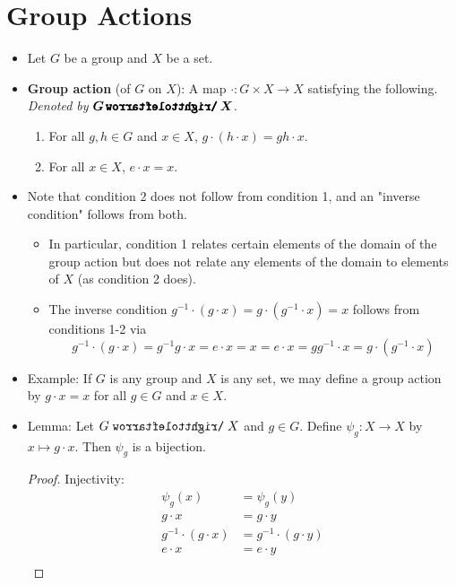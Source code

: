 \documentclass[../notes.tex]{subfiles}
\begin{document}
\section{Group Actions}
\begin{itemize}
    \item {}Let $G$ be a group and $X$ be a set.
    \item \textbf{Group action} (of $G$ on $X$): A map $\cdot:G\times X\to X$ satisfying the following. \emph{Denoted by} $\bm{G\,\pmb{\acts}\,X}$.
    \begin{enumerate}
        \item For all $g,h\in G$ and $x\in X$, $g\cdot(h\cdot x)=gh\cdot x$.
        \item For all $x\in X$, $e\cdot x=x$.
    \end{enumerate}
    \item Note that condition 2 does not follow from condition 1, and an "inverse condition" follows from both.
    \begin{itemize}
        \item In particular, condition 1 relates certain elements of the domain of the group action but does not relate any elements of the domain to elements of $X$ (as condition 2 does).
        \item The inverse condition $g^{-1}\cdot(g\cdot x)=g\cdot(g^{-1}\cdot x)=x$ follows from conditions 1-2 via
        \begin{equation*}
            g^{-1}\cdot(g\cdot x) = g^{-1}g\cdot x
            = e\cdot x
            = x
            = e\cdot x
            = gg^{-1}\cdot x
            = g\cdot(g^{-1}\cdot x)
        \end{equation*}
    \end{itemize}
    \item Example: If $G$ is any group and $X$ is any set, we may define a group action by $g\cdot x=x$ for all $g\in G$ and $x\in X$.
    \item Lemma: Let $G\acts X$ and $g\in G$. Define $\psi_g:X\to X$ by $x\mapsto g\cdot x$. Then $\psi_g$ is a bijection.
    \begin{proof}
        Injectivity:
        \begin{align*}
            \psi_g(x) &= \psi_g(y)\\
            g\cdot x &= g\cdot y\\
            g^{-1}\cdot(g\cdot x) &= g^{-1}\cdot(g\cdot y)\\
            e\cdot x &= e\cdot y\\

\end{align*}
\end{proof}
\end{itemize}
\end{document}
